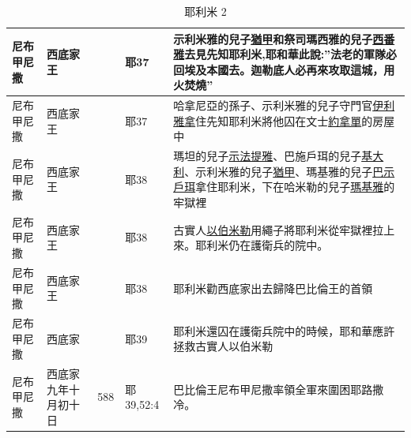 \begin{table}[!hbp]
\begin{tabular}{|p{1.8cm}|p{2cm}|p{1.5cm}|p{1.7cm}|p{8.5cm}| }
尼布甲尼撒& 西底家王&   &耶37  &示利米雅的兒子\underline{猶甲}和祭司瑪西雅的兒子\underline{西番雅}去見先知耶利米,耶和華此說:''法老的軍隊必回埃及本國去。迦勒底人必再來攻取這城，用火焚燒'' \\\hline

尼布甲尼撒& 西底家王&   &耶37  &哈拿尼亞的孫子、示利米雅的兒子守門官\underline{伊利雅拿}住先知耶利米將他囚在文士\underline{約拿單}的房屋中 \\\hline

尼布甲尼撒& 西底家王&   &耶38  &瑪坦的兒子\underline{示法提雅}、巴施戶珥的兒子\underline{基大利}、示利米雅的兒子\underline{猶甲}、瑪基雅的兒子\underline{巴示戶珥}拿住耶利米，下在哈米勒的兒子\underline{瑪基雅}的牢獄裡\\\hline

尼布甲尼撒& 西底家王&   &耶38  &古實人\underline{以伯米勒}用繩子將耶利米從牢獄裡拉上來。耶利米仍在護衛兵的院中。\\\hline

尼布甲尼撒& 西底家王&   &耶38  &耶利米勸西底家出去歸降巴比倫王的首領\\\hline
尼布甲尼撒 &西底家  & &耶39  & 耶利米還囚在護衛兵院中的時候，耶和華應許拯救古實人以伯米勒 \\\hline 

 尼布甲尼撒 &西底家九年十月初十日 &588&耶39,52:4  & 巴比倫王尼布甲尼撒率領全軍來圍困耶路撒冷。\\\hline 
 

\end{tabular}
\caption{耶利米 2}
\end{table}


